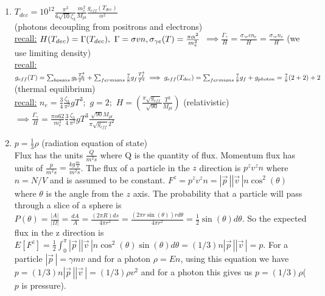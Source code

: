 \documentclass[12pt]{amsart}
\begin{document}
\begin{enumerate}
\hdashrule[0.5ex][c]{\linewidth}{0.5pt}{1.5mm}


\item \underline{$T_{dec} = 10^{12} \frac{\pi^2}{6 \sqrt{10} \zeta_3} \frac{m_e^2}{M_{pl}} \frac{g_{eff} (T_{dec})}{\alpha^2}$}\\
(photons decoupling from positrons and electrons)\\
\underline{recall:} $H(T_{dec}) = \Gamma(T_{dec}),\,\, \Gamma = \sigma v n, \sigma_{\gamma e}(T) = \frac{\pi \alpha^2}{m_e^2}\\$
$\implies \frac{\Gamma_{\gamma}}{H} = \frac{\sigma_{\gamma e} c n_e}{H} = \frac{\sigma_{\gamma e} n_e}{H}$ (we use limiting density)\\
\underline{recall:} $g_{eff}(T) = \sum_{bosons} g_b \frac{T_b^4}{T^4} + \sum_{fermions} \frac{7}{8} g_f \frac{T_f^4}{T^4}\\
\implies g_{eff}(T_{dec}) = \sum_{fermions} \frac{7}{8} g_f + g_{photon}\\
= \frac{7}{8} (2 + 2) + 2$ (thermal equilibrium)\\
\underline{recall:} $n_e = \frac{3}{4} \frac{\zeta_3}{\pi^2} g T^3;\,\, g=2;\,\, H= ( \frac{\pi \sqrt{g_{eff}}}{\sqrt{90}} \frac{T^2}{M_{pl}})$ (relativistic)\\
$\implies \frac{\Gamma_{\gamma}}{H} = \frac{\pi \alpha62}{m_e^2} \frac{3}{4} \frac{\zeta_3}{ \pi^2} g T^3 \frac{\sqrt{90} M_{pl}}{ \pi \sqrt{g_{eff}} T^2}$\\


\hdashrule[0.5ex][c]{\linewidth}{0.5pt}{1.5mm}


\item \underline{$p=\frac{1}{3} \rho$} (radiation equation of state)\\
Flux has the units $\frac{Q}{m^2 s}$ where Q is the quantity of flux. Momentum flux has units of $\frac{p}{m^2 s}=\frac{kg \frac{m}{s}}{m^2 s}$. The flux of a particle in the $z$ direction is $p^z v^z n$ where $n=N/V$ and is assumed to be constant. $F^z=p^z v^z n=|\vec{p}\,| |\vec{v}\,| n \cos^2(\theta)$ where $\theta$ is the angle from the $z$ axis. The probability that a particle will pass through a slice of a sphere is $P(\theta)=\frac{|A|}{|\Omega|}=\frac{dA}{A}=\frac{(2\pi R) ds}{4\pi r^2}=\frac{(2\pi r \sin(\theta))r d{\theta}}{4 \pi r^2}=\frac{1}{2} \sin(\theta) d{\theta}$.
So the expected flux in the z direction is\\
$E[F^z]=\frac{1}{2} \int_0 ^\pi |\vec{p}\,| |\vec{v}\,| n \cos^2(\theta) \sin(\theta) d{\theta}=(1/3) n |\vec{p}\,| |\vec{v}\,|=p$. For a particle $|\vec{p}\,|=\gamma m v$ and for a photon $\rho=En$, using this equation we have
$p=(1/3) n |\vec{p}\,| |\vec{v}\,|=(1/3) \rho v^2$ and for a photon this gives us $p=(1/3) \rho$($p$ is pressure).



\end{enumerate}
\end{document}
